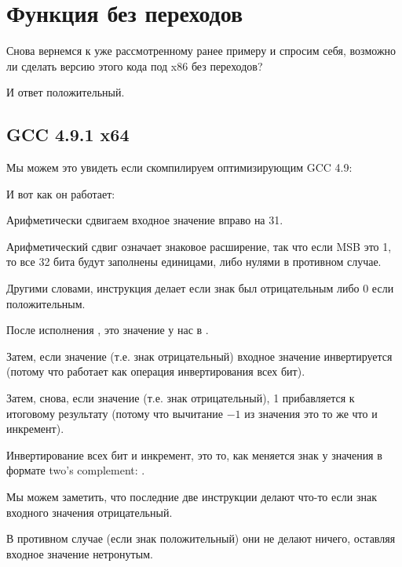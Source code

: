 \chapter{Функция  без переходов}
\label{chap:branchless_abs}

Снова вернемся к уже рассмотренному ранее примеру  и спросим себя, возможно ли
сделать версию этого кода под x86 без переходов?



И ответ положительный.

\section{\Optimizing GCC 4.9.1 x64}

Мы можем это увидеть если скомпилируем оптимизирующим GCC 4.9:



И вот как он работает:

Арифметически сдвигаем входное значение вправо на 31.

Арифметический сдвиг означает знаковое расширение, так что если \ac{MSB} это 1, то все 32 бита будут
заполнены единицами, либо нулями в противном случае.

Другими словами, инструкция  делает  если знак был отрицательным либо 0 если
положительным.

После исполнения , это значение у нас в \EDX.

Затем, если значение  (т.е. знак отрицательный) входное значение инвертируется
(потому что  работает как операция инвертирования всех бит).

Затем, снова, если значение  (т.е. знак отрицательный), 1 прибавляется к итоговому результату
(потому что вычитание $-1$ из значения это то же что и инкремент).

Инвертирование всех бит и инкремент, это то, как меняется знак у значения в формате two's complement: 
.

Мы можем заметить, что последние две инструкции делают что-то если знак входного значения отрицательный.

В противном случае (если знак положительный) они не делают ничего, оставляя входное значение нетронутым.

